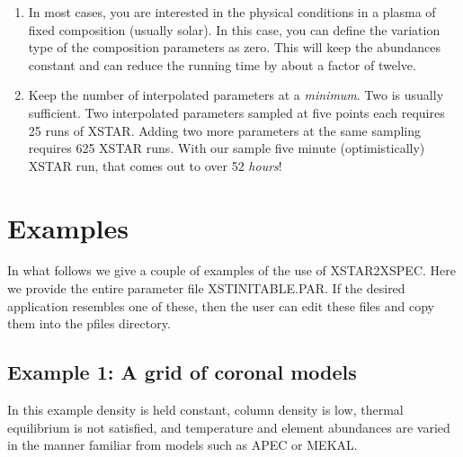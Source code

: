 \begin{enumerate}
	\item  In most cases, you are interested in the physical conditions 
	in a plasma of fixed composition (usually solar).  In this case, you 
	can define the variation type of the composition parameters as 
	zero.  This will keep the abundances constant and can reduce the 
	running time by about a factor of twelve.

	\item  Keep the number of interpolated parameters at a {\it 
	minimum}.  Two is usually sufficient.  Two interpolated parameters 
	sampled at five points each requires 25 runs of XSTAR.  Adding two 
	more parameters at the same sampling requires 625 XSTAR runs.  With 
	our sample five minute (optimistically) XSTAR run, that comes out 
	to over 52 {\it hours}!

\end{enumerate}

\section{Examples}

In what follows we give a couple of examples of the use of XSTAR2XSPEC.  
Here we provide the entire parameter file XSTINITABLE.PAR.  If the 
desired application resembles one of these, then the user can edit these 
files and copy them into the pfiles directory.

\subsection{Example 1: A grid of coronal models}

In this example density is held constant, column density is low, 
thermal equilibrium is not satisfied, and temperature and 
element abundances are varied in the manner familiar from 
models such as APEC or MEKAL.

